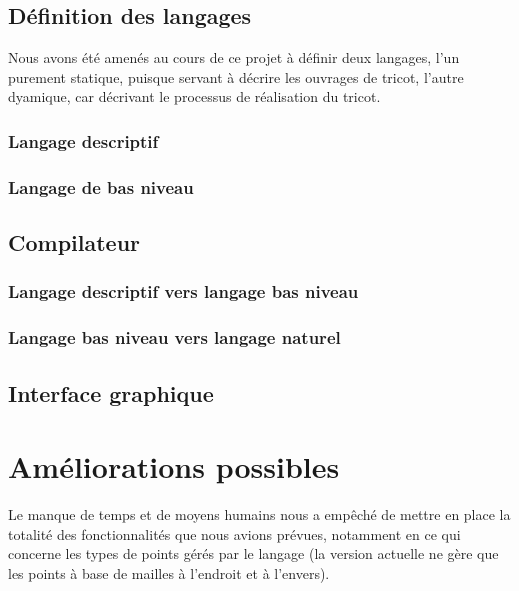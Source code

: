 \documentclass{article}
\begin{document}
\subsection{Définition des langages}

Nous avons été amenés au cours de ce projet à définir deux langages, l'un purement statique, puisque servant à décrire les ouvrages de tricot, l'autre dyamique, car 
décrivant le processus de réalisation du tricot.

\subsubsection{Langage descriptif}

\subsubsection{Langage de bas niveau}

\subsection{Compilateur}

\subsubsection{Langage descriptif vers langage bas niveau}

\subsubsection{Langage bas niveau vers langage naturel}




\subsection{Interface graphique}





\section{Améliorations possibles}

Le manque de temps et de moyens humains nous a empêché de mettre en place la totalité des fonctionnalités que nous avions prévues, notamment en ce qui concerne les 
types de points gérés par le langage (la version actuelle ne gère que les points à base de mailles à l'endroit et à l'envers).
\end{document}
